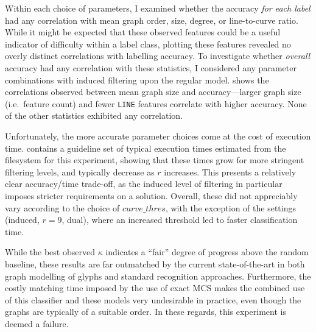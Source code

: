 \documentclass{mpaper}
\begin{document}

Within each choice of parameters, I examined whether the accuracy \emph{for each label} had any correlation with mean graph order, size, degree, or line-to-curve ratio.
While it might be expected that these observed features could be a useful indicator of difficulty within a label class, plotting these features revealed no overly distinct correlations with labelling accuracy.
To investigate whether \emph{overall} accuracy had any correlation with these statistics, I considered any parameter combinations with induced filtering upon the regular model.
 shows the correlations observed between mean graph size and accuracy---larger graph size (i.e.\ feature count) and fewer \texttt{LINE} features correlate with higher accuracy.
None of the other statistics exhibited any correlation.

Unfortunately, the more accurate parameter choices come at the cost of execution time.
 contains a guideline set of typical execution times estimated from the filesystem for this experiment, showing that these times grow for more stringent filtering levels, and typically decrease as $r$ increases.
This presents a relatively clear accuracy/time trade-off, as the induced level of filtering in particular imposes stricter requirements on a solution.
Overall, these did not appreciably vary according to the choice of $\mathit{curve\_thres}$, with the exception of the settings (induced, $r=9$, dual), where an increased threshold led to faster classification time.

While the best observed $\kappa$ indicates a ``fair'' degree of progress above the random baseline, these results are far outmatched by the current state-of-the-art in both graph modelling of glyphs and standard recognition approaches.
Furthermore, the costly matching time imposed by the use of exact MCS makes the combined use of this classifier and these models very undesirable in practice, even though the graphs are typically of a suitable order.
In these regards, this experiment is deemed a failure.
\end{document}
